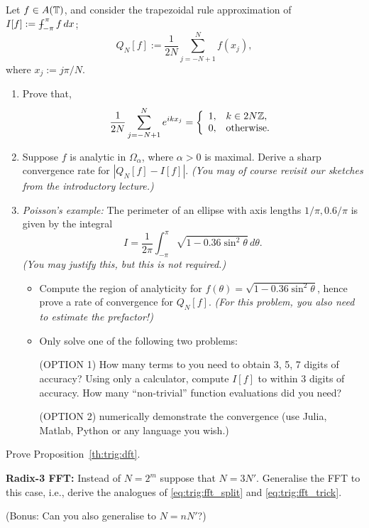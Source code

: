 \begin{exercise}
  \label{exr:trig:trapezoidal rule}
  Let $f \in A(\mathbb{T})$, and consider the trapezoidal rule approximation
  of $I[f] := \mint_{-\pi}^\pi f\,dx$;
  \[
    Q_N[f] := \frac{1}{2N} \sum_{j = -N+1}^N f(x_j),
  \]
  where $x_j := j\pi/N$.
  \begin{enumerate} \ilist
    \item Prove that,
    \[
        \frac{1}{2N} \sum_{j = -N+1}^N e^{ikx_j} =
          \left\{ \begin{array}{ll} 
              1, & k \in 2N \mathbb{Z}, \\
              0, & \text{otherwise.}
           \end{array} \right.
    \]

    \item Suppose $f$ is analytic in $\Omega_\alpha$, where $\alpha > 0$ is
    maximal. Derive a sharp convergence rate for $|Q_N[f] - I[f]|$.
    {\it (You may of course revisit our sketches from the introductory lecture.)}

    \item {\it Poisson's example: } The perimeter of an ellipse with axis
    lengths $1/\pi, 0.6/\pi$ is given by the integral
    \[
        I = \frac{1}{2\pi} \int_{-\pi}^\pi \sqrt{1 - 0.36 \sin^2\theta}\,d\theta.
    \]
    {\it (You may justify this, but this is not required.)}
    \begin{itemize}
      \item Compute the region of analyticity for $f(\theta) = \sqrt{1 - 0.36
      \sin^2\theta}$, hence prove a rate of convergence for $Q_N[f]$.
      {\it (For this problem, you also need to estimate the prefactor!)}
      \item Only solve one of the following two problems:

      (OPTION 1) How many terms to you need to obtain 3, 5, 7 digits of accuracy?
      Using only a calculator, compute $I[f]$ to within 3 digits of accuracy.
      How many ``non-trivial'' function evaluations did you need?

      (OPTION 2) numerically demonstrate the convergence (use Julia, Matlab, Python or any language you wish.) \qedhere
    \end{itemize}
  \end{enumerate}
\end{exercise}




\begin{exercise}
  Prove Proposition~\ref{th:trig:dft}.
\end{exercise}

\begin{exercise}
  {\bf Radix-3 FFT: } Instead of $N = 2^m$ suppose that $N = 3 N'$. Generalise
  the FFT to this case, i.e., derive the analogues of \eqref{eq:trig:fft_split}
  and \eqref{eq:trig:fft_trick}.

  (Bonus: Can you also generalise to $N = n N'$?)
\end{exercise}

